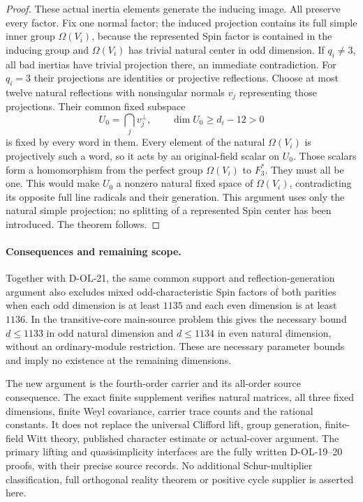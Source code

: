\begin{proof}
These actual inertia elements generate the inducing image.
All preserve every factor.  Fix one normal factor; the
induced projection contains its full simple inner group
$\Omega(V_i)$, because the represented Spin factor is
contained in the inducing group and
$\Omega(V_i)$ has trivial natural center in odd dimension.
If $q_i\ne3$, all bad inertias have trivial projection
there, an immediate contradiction.  For $q_i=3$ their
projections are identities or projective reflections.
Choose at most twelve natural reflections with
nonsingular normals $v_j$ representing those projections.
Their common fixed subspace
\[
          U_0=\bigcap_jv_j^\perp,\qquad
                         \dim U_0\ge d_i-12>0              \tag{OSP.21}
\]
is fixed by every word in them.  Every element of the
natural $\Omega(V_i)$ is projectively such a word,
so it acts by an original-field scalar on $U_0$.
Those scalars form a homomorphism from the perfect group
$\Omega(V_i)$ to $F_3^*$.  They must all be one.
This would make $U_0$ a nonzero natural fixed space of
$\Omega(V_i)$, contradicting its opposite full line
radicals and their generation.  This argument uses only
the natural simple projection; no splitting of a
represented Spin center has been introduced.
The theorem follows.
\end{proof}

\paragraph{Consequences and remaining scope.}
Together with D-OL-21, the same common support and
reflection-generation argument also excludes mixed
odd-characteristic Spin factors of both parities when
each odd dimension is at least $1135$ and each even
dimension is at least $1136$.
In the transitive-core main-source problem this gives
the necessary bound $d\le1133$ in odd natural dimension
and $d\le1134$ in even natural dimension, without an
ordinary-module restriction.  These are necessary
parameter bounds and imply no existence at the
remaining dimensions.

The new argument is the fourth-order carrier and its
all-order source consequence.  The exact finite
supplement verifies natural matrices, all three fixed
dimensions, finite Weyl covariance, carrier trace
counts and the rational constants.  It does not
replace the universal Clifford lift, group generation,
finite-field Witt theory, published character estimate
or actual-cover argument.  The primary lifting and
quasisimplicity interfaces are the fully written
D-OL-19--20 proofs, with their precise source records.
No additional Schur-multiplier classification, full
orthogonal reality theorem or positive cycle supplier
is asserted here.
